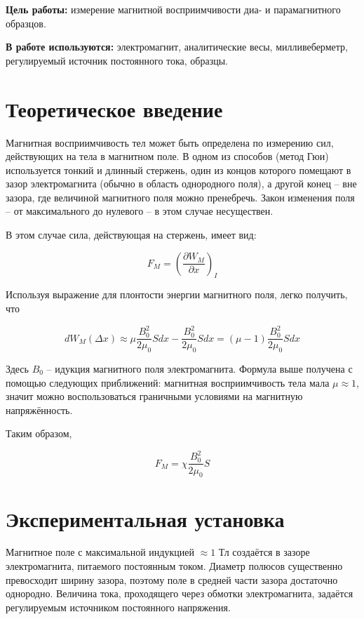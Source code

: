 \textbf{Цель работы:} измерение магнитной восприимчивости диа- и парамагнитного образцов.

\textbf{В работе используются:} электромагнит, аналитические весы, милливеберметр, регулируемый источник постоянного тока, образцы.
                    
\section{Теоретическое введение}

Магнитная восприимчивость тел может быть определена по измерению сил, действующих на тела в магнитном поле. В одном из способов (метод Гюи) используется
тонкий и длинный стержень, один из концов которого помещают в зазор электромагнита (обычно в область однородного поля), а другой конец -- вне зазора, где величиной магнитного поля можно пренебречь. Закон изменения поля -- от максимального до нулевого -- в этом случае несуществен.

В этом случае сила, действующая на стержень, имеет вид:

\begin{equation}
    F_M = \left( \frac{\partial W_M}{\partial x} \right)_I
\end{equation}

Используя выражение для плонтости энергии магнитного поля, легко получить, что

\begin{equation}
    dW_M(\Delta x) \approx \mu \frac{B_0^2}{2 \mu_0} S dx - \frac{B_0^2}{2 \mu_0} S dx = (\mu - 1) \frac{B_0^2}{2 \mu_0} S dx
\end{equation}

Здесь $B_0$ -- идукция магнитного поля электромагнита. Формула выше получена с помощью следующих приближений: магнитная восприимчивость тела мала $\mu \approx 1$, значит можно воспользоваться граничными условиями на магнитную напряжённость.

Таким образом,

\begin{equation}
    F_M = \chi \frac{B_0^2}{2 \mu_0} S
\end{equation}

\section{Экспериментальная установка}

Магнитное поле с максимальной индукцией $\approx 1$ Тл создаётся в зазоре электромагнита, питаемого постоянным током. Диаметр полюсов существенно превосходит ширину зазора, поэтому поле в средней части зазора достаточно однородно. Величина тока, проходящего через обмотки электромагнита, задаётся регулируемым источником постоянного напряжения.

